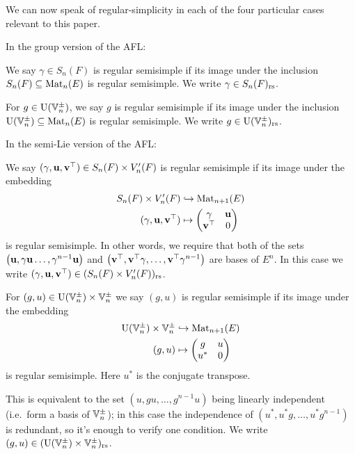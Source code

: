 We can now speak of regular-simplicity in each of the four
particular cases relevant to this paper.
\begin{definition}
  In the group version of the AFL:
  \begin{itemize}
    \ii We say $\gamma \in S_n(F)$ is regular semisimple
    if its image under the inclusion $S_n(F) \subseteq \operatorname{Mat}_n(E)$ is regular semisimple.
    We write $\gamma \in S_n(F)_{\mathrm{rs}}$.

    \ii For $g \in \operatorname{U}(\mathbb V_n^\pm)$,
    we say $g$ is regular semisimple
    if its image under the inclusion $\operatorname{U}(\mathbb V_n^\pm) \subseteq \operatorname{Mat}_n(E)$ is regular semisimple.
    We write $g \in \operatorname{U}(\mathbb V_n^\pm)_{\mathrm{rs}}$.
  \end{itemize}
  In the semi-Lie version of the AFL:
  \begin{itemize}
    \ii We say $(\gamma, \mathbf u, \mathbf v^\top) \in S_n(F) \times V'_n(F)$
    is regular semisimple if its image under the embedding
    \begin{equation}
      \begin{aligned}
        S_n(F) \times V'_n(F) &\hookrightarrow \operatorname{Mat}_{n+1}(E) \\
        (\gamma, \mathbf u, \mathbf v^\top) &\mapsto \begin{pmatrix} \gamma & \mathbf u \\ \mathbf v^\top & 0 \end{pmatrix}
      \end{aligned}
      \label{eq:embed_FJ_analytic}
    \end{equation}
    is regular semisimple.
    In other words, we require that
    both of the sets
    $\left( \mathbf u, \gamma \mathbf u \dots, \gamma^{n-1}\mathbf u \right)$
    and
    $\left( \mathbf v^\top, \mathbf v^\top \gamma, \dots, \mathbf v^\top \gamma^{n-1} \right)$
    are bases of $E^n$.
    In this case we write $(\gamma, \mathbf u, \mathbf v^\top) \in (S_n(F) \times V'_n(F))_{\mathrm{rs}}$.

    \ii For $(g,u) \in \operatorname{U}(\mathbb V_n^\pm) \times \mathbb V_n^\pm$ we say $(g, u)$
    is regular semisimple if its image under the embedding
    \begin{equation}
      \begin{aligned}
        \operatorname{U}(\mathbb V_n^\pm) \times \mathbb V_n^\pm &\hookrightarrow \operatorname{Mat}_{n+1}(E) \\
        (g, u) &\mapsto \begin{pmatrix} g & u \\ u^\ast & 0 \end{pmatrix}
      \end{aligned}
      \label{eq:embed_FJ_geometric}
    \end{equation}
    is regular semisimple.
    Here $u^\ast$ is the conjugate transpose.

    This is equivalent to the set $\left(  u, gu, \dots, g^{n-1}u \right)$
    being linearly independent (i.e.\ form a basis of $\mathbb V_n^\pm$);
    in this case the independence of $\left( u^\ast, u^\ast g, \dots, u^\ast g^{n-1} \right)$
    is redundant, so it's enough to verify one condition.
    We write $(g,u) \in (\operatorname{U}(\mathbb V_n^\pm) \times \mathbb V_n^\pm)_{\mathrm{rs}}$.
  \end{itemize}
  \label{def:regular}
\end{definition}

